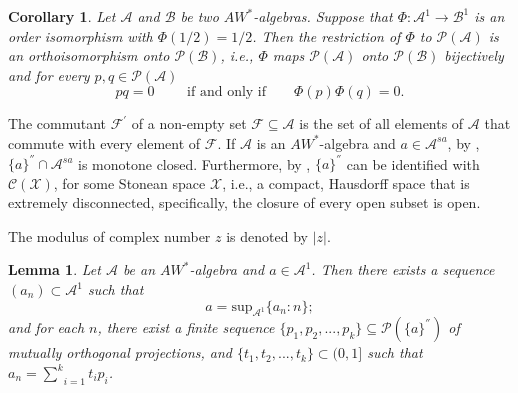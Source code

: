 \documentclass[12pt]{amsart}
\newtheorem{cor}[thm]{Corollary}
\newtheorem{lem}[thm]{Lemma}
\theoremstyle{definition}
\theoremstyle{remark}
\numberwithin{equation}{section}
\begin{document}
\begin{cor}\label{orthoisomorphism}
Let $\mathcal{A}$ and $\mathcal{B}$ be two $AW^*$-algebras.  Suppose that    $\Phi:\mathcal{A}^1\to \mathcal{B}^1$ is an order isomorphism  with $\Phi(1/2)=1/2$. Then the restriction of $\Phi$ to $\mathcal{P(A)}$ is an orthoisomorphism 	onto $\mathcal{P(B)}$, i.e., $\Phi$
maps $\mathcal{P(A)}$ onto $\mathcal{P(B)}$ bijectively and   for every  $p,q \in \mathcal{P(A)}$ $$pq=0 \qquad  \mbox{ if and only if}  \qquad \Phi(p) \Phi(q)=0.$$
\end{cor}








The commutant $\mathcal{F}^{'}$ of a non-empty set $\mathcal{F} \subseteq \mathcal{A}$ is the set of all elements of $\mathcal{A}$ that commute with every element of $\mathcal{F}$. If $\mathcal{A}$ is an $AW^*$-algebra and $a\in\mathcal{A}^{sa}$, by \cite{Saito-wright}, $\{a\}^{''}\cap \mathcal{A}^{sa}$ is  monotone closed. Furthermore, by \cite{Berberian}, $\{a\}^{''}$  can be identified with $\mathcal{C(X)}$, for some Stonean space $\mathcal{X}$, i.e., a compact, Hausdorff space that is extremely disconnected, specifically, the closure of every open  subset is open.

The modulus of  complex number $z$ is denoted by $|z|$.
\begin{lem}\label{finite.sum}
	Let $\mathcal{A}$ be an $AW^*$-algebra and  $a\in\mathcal{A}^1$. Then there exists a sequence $(a_n)\subset\mathcal{A}^1$ such that $$a=\mathrm{sup}_{\mathcal{A}^{1}}\{a_n:n\};$$
and for each $n$, there exist a finite sequence $\{p_1,p_2,...,p_k\}\subseteq\mathcal{P}(\{a\}^{''})$ of  mutually orthogonal projections, and $\{t_1,t_2,...,t_k\}\subset(0,1]$ such that $a_n= \underset{i=1}{\overset{k}{\sum}} t_ip_i$.
	\end{lem}
\end{document}
